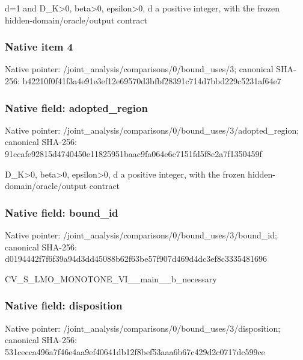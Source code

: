 \documentclass[10pt,a4paper]{article}
\begin{document}
\begingroup\raggedright\sloppy d=\allowbreak{}1 and D\_\allowbreak{}K>0,\allowbreak{} beta>0,\allowbreak{} epsilon>0,\allowbreak{} d a positive integer,\allowbreak{} with the frozen hidden-domain/\allowbreak{}oracle/\allowbreak{}output contract\par\endgroup

\subsubsection{Native item 4}
Native pointer: /joint\_\allowbreak{}analysis/comparisons/0/bound\_\allowbreak{}uses/3; canonical SHA-256: b42210f0f41f3a4e91e3ef12e69570d3bfbf28391c714d7bbd229c5231af64e7

\subsubsection{Native field: adopted\_\allowbreak{}region}
Native pointer: /joint\_\allowbreak{}analysis/comparisons/0/bound\_\allowbreak{}uses/3/adopted\_\allowbreak{}region; canonical SHA-256: 91ccafe92815d4740450e11825951baac9fa064e6c7151fd5f8c2a7f1350459f

\begingroup\raggedright\sloppy D\_\allowbreak{}K>0,\allowbreak{} beta>0,\allowbreak{} epsilon>0,\allowbreak{} d a positive integer,\allowbreak{} with the frozen hidden-domain/\allowbreak{}oracle/\allowbreak{}output contract\par\endgroup

\subsubsection{Native field: bound\_\allowbreak{}id}
Native pointer: /joint\_\allowbreak{}analysis/comparisons/0/bound\_\allowbreak{}uses/3/bound\_\allowbreak{}id; canonical SHA-256: d0194442f7f6f39a94d3dd45088b62f63be57f907d469d4dc3ef8c3335481696

\begingroup\raggedright\sloppy CV\_\allowbreak{}S\_\allowbreak{}LMO\_\allowbreak{}MONOTONE\_\allowbreak{}VI\_\allowbreak{}\_\allowbreak{}main\_\allowbreak{}\_\allowbreak{}b\_\allowbreak{}necessary\par\endgroup

\subsubsection{Native field: disposition}
Native pointer: /joint\_\allowbreak{}analysis/comparisons/0/bound\_\allowbreak{}uses/3/disposition; canonical SHA-256: 531cecca496a7f46e4aa9ef40641db12f8bef53aaa6b67c429d2c0717dc599ce
\end{document}
